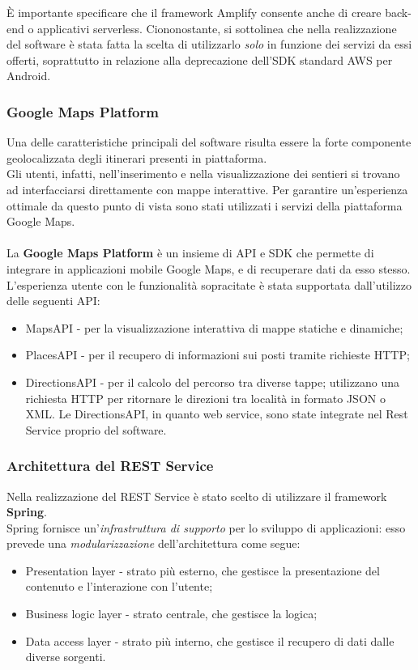 \documentclass{natourDoc}
\begin{document}
È importante specificare che il framework Amplify consente anche di creare back-end o applicativi serverless. Ciononostante, si sottolinea che
nella realizzazione del software è stata fatta la scelta di utilizzarlo \textit{solo} in funzione dei servizi da essi offerti, soprattutto in relazione alla deprecazione
dell'SDK standard AWS per Android.

\subsubsection{Google Maps Platform}
Una delle caratteristiche principali del software risulta essere la forte componente geolocalizzata degli itinerari presenti in piattaforma. \\
Gli utenti, infatti, nell'inserimento e nella visualizzazione dei sentieri si trovano ad interfacciarsi direttamente con mappe interattive.
Per garantire un'esperienza ottimale da questo punto di vista sono stati utilizzati i servizi della piattaforma Google Maps. \\\\
La \textbf{Google Maps Platform} è un insieme di API e SDK che permette di integrare in applicazioni mobile Google Maps, e di recuperare dati da esso stesso.
L'esperienza utente con le funzionalità sopracitate è stata supportata dall'utilizzo delle seguenti API:
\begin{itemize}
	\item MapsAPI - per la visualizzazione interattiva di mappe statiche e dinamiche;
	\item PlacesAPI - per il recupero di informazioni sui posti tramite richieste HTTP;
	\item DirectionsAPI - per il calcolo del percorso tra diverse tappe; utilizzano una richiesta HTTP per ritornare le direzioni tra località in formato JSON o XML.
	      Le DirectionsAPI, in quanto web service, sono state integrate nel Rest Service proprio del software.
\end{itemize}

\subsubsection{Architettura del REST Service}
Nella realizzazione del REST Service è stato scelto di utilizzare il framework \textbf{Spring}. \\
Spring fornisce un'\textit{infrastruttura di supporto} per lo sviluppo di applicazioni: esso prevede una \textit{modularizzazione} dell'architettura come segue:
\begin {itemize}
\item Presentation layer - strato più esterno, che gestisce la presentazione del contenuto e l'interazione con l'utente;
\item Business logic layer - strato centrale, che gestisce la logica;
\item Data access layer - strato più interno, che gestisce il recupero di dati dalle diverse sorgenti.
\end{itemize}
\end{document}
